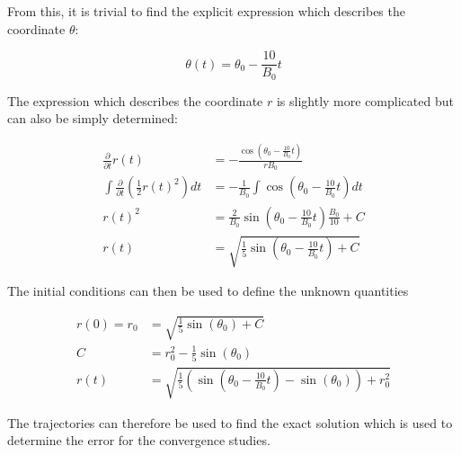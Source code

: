 From this, it is trivial to find the explicit expression which describes the coordinate $\theta$:

\begin{equation}
 \theta(t) = \theta_0 - \frac{10}{B_0} t
\end{equation}

The expression which describes the coordinate $r$ is slightly more complicated but can also be simply determined:

\begin{align*}
 \frac{\partial}{\partial t} r(t) &= - \frac{\cos\left(\theta_0 - \frac{10}{B_0} t\right)}{rB_0}\\
 \int \frac{\partial}{\partial t}\left(\frac{1}{2}r(t)^2\right) dt &= - \frac{1}{B_0} \int \cos\left(\theta_0 - \frac{10}{B_0} t\right) dt\\
 r(t)^2 &= \frac{2}{B_0} \sin\left(\theta_0 - \frac{10}{B_0}t\right)\frac{B_0}{10} + C\\
 r(t) &= \sqrt{\frac{1}{5}\sin\left(\theta_0 - \frac{10}{B_0}t\right) + C}
\end{align*}

The initial conditions can then be used to define the unknown quantities

\begin{align}
 r(0) = r_0 &= \sqrt{\frac{1}{5}\sin(\theta_0) + C}\nonumber\\
 C &= r_0^2-\frac{1}{5}\sin(\theta_0)\nonumber\\
 r(t) &= \sqrt{\frac{1}{5}\left(\sin\left(\theta_0 - \frac{10}{B_0}t\right)-\sin(\theta_0)\right)+r_0^2}
\end{align}

The trajectories can therefore be used to find the exact solution which is used to determine the error for the convergence studies.

